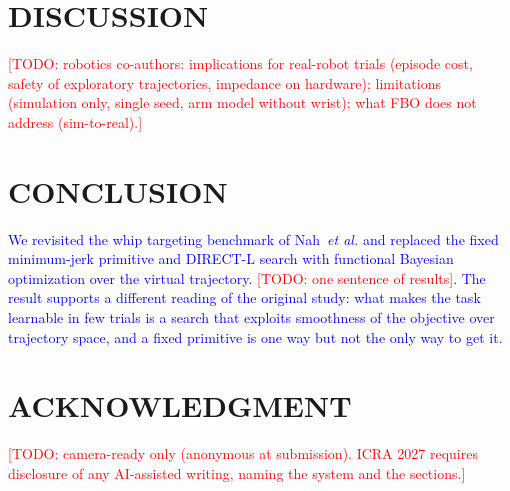 \documentclass[letterpaper, 10 pt, conference]{ieeeconf}
\newcommand{\todo}[1]{\textcolor{red}{[TODO: #1]}}
\newcommand{\draft}[1]{\textcolor{blue}{#1}}
\begin{document}
\section{DISCUSSION}
\todo{robotics co-authors: implications for real-robot trials (episode cost,
safety of exploratory trajectories, impedance on hardware); limitations
(simulation only, single seed, arm model without wrist); what FBO does not
address (sim-to-real).}

\section{CONCLUSION}
\draft{
We revisited the whip targeting benchmark of Nah~\emph{et al.} and replaced the
fixed minimum-jerk primitive and DIRECT-L search with functional Bayesian
optimization over the virtual trajectory. \todo{one sentence of results}. The
result supports a different reading of the original study: what makes the task
learnable in few trials is a search that exploits smoothness of the objective
over trajectory space, and a fixed primitive is one way but not the only way to
get it.
}


\section*{ACKNOWLEDGMENT}
\todo{camera-ready only (anonymous at submission). ICRA 2027 requires
disclosure of any AI-assisted writing, naming the system and the sections.}



\end{document}
